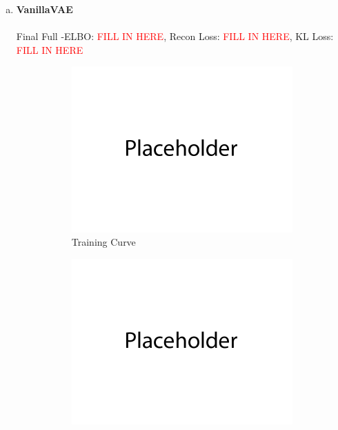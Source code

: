 \documentclass{article}
\begin{document}
\begin{enumerate}[(a)]
  \item {\bf VanillaVAE} \\\\
  Final Full -ELBO: \textcolor{red}{FILL IN HERE}, Recon Loss: \textcolor{red}{FILL IN HERE}, KL Loss: \textcolor{red}{FILL IN HERE}
  \begin{figure}[H]
         \centering
         \begin{subfigure}[b]{0.475\textwidth}
             \centering
             \includegraphics[width=\textwidth]{figures/q2_a_train_plot.png}
             \caption{Training Curve}
         \end{subfigure}
         \hfill
         \begin{subfigure}[b]{0.475\textwidth}
             \centering
             \includegraphics[width=\textwidth]{figures/q2_a_samples.png}

\end{subfigure}
\end{figure}
\end{enumerate}
\end{document}
